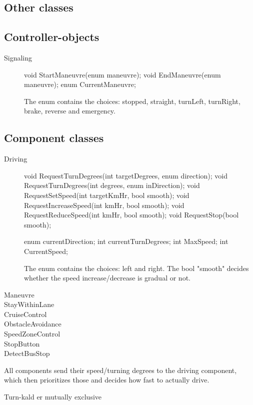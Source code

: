 \subsection{Other classes}
\subsection{Controller-objects}
\begin{description}
    \item [Signaling]
    void StartManeuvre(enum maneuvre);
    void EndManeuvre(enum maneuvre);
    enum CurrentManeuvre;
    
    The enum contains the choices: stopped, straight, turnLeft, turnRight, brake, reverse and emergency. 
\end{description}

\subsection{Component classes}
\begin{description}
    \item [Driving]
    void RequestTurnDegrees(int targetDegrees, enum direction);
    void RequestTurnDegrees(int degrees, enum inDirection);
    void RequestSetSpeed(int targetKmHr, bool smooth);
    void RequestIncreaseSpeed(int kmHr, bool smooth);
    void RequestReduceSpeed(int kmHr, bool smooth);
    void RequestStop(bool smooth);
    
    enum currentDirection;
    int currentTurnDegrees;
    int MaxSpeed;
    int CurrentSpeed;

    The enum contains the choices: left and right. The bool "smooth" decides whether the speed increase/decrease is gradual or not. 
    
    \item [Maneuvre]
    \item [StayWithinLane]
    \item [CruiseControl]
    \item [ObstacleAvoidance]
    \item [SpeedZoneControl]
    \item [StopButton]
    \item [DetectBusStop]
\end{description}


All components send their speed/turning degrees to the driving component, which then prioritizes those and decides how fast to actually drive. 

Turn-kald er mutually exclusive

